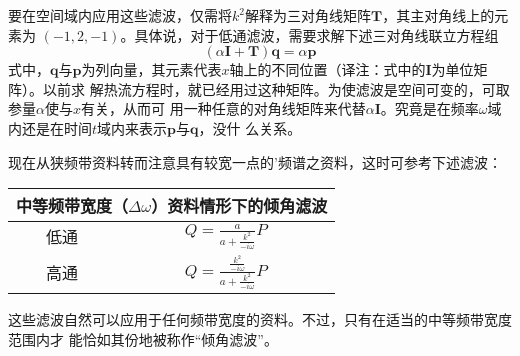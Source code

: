 要在空间域内应用这些滤波，仅需将$k^2$解释为三对角线矩阵$\mathbf{T}$，其主对角线上的元素为
$(-1,2,-1)$。具体说，对于低通滤波，需要求解下述三对角线联立方程组
\begin{equation}
(\alpha\mathbf{I}+\mathbf{T})\mathbf{q}=\alpha\mathbf{p}
\label{eq:ex2.5.1}
\end{equation}
式中，$\mathbf{q}$与$\mathbf{p}$为列向量，其元素代表$x$轴上的不同位置（译注：式中的$\mathbf{I}$为单位矩阵）。以前求
解热流方程时，就已经用过这种矩阵。为使滤波是空间可变的，可取参量$\alpha$使与$x$有关，从而可
用一种任意的对角线矩阵来代替$\alpha\mathbf{I}$。究竟是在频率$\omega$域内还是在时间$t$域内来表示$\mathbf{p}$与$\mathbf{q}$，没什
么关系。

现在从狭频带资料转而注意具有较宽一点的'频谱之资料，这时可参考下述滤波：

\begin{table}
\centering
\begin{tabular}{|c|c|}
\hline
\multicolumn{2}{|c|}{中等频带宽度（$\Delta\omega$）资料情形下的倾角滤波} \\ \hline
低通&$Q=\frac{a}{a+\frac{k^2}{-i\omega}}P$\\ \hline
高通&$Q=\frac{\frac{k^2}{-i\omega}}{a+\frac{k^2}{-i\omega}}P$ \\ \hline
\end{tabular}
\end{table}

这些滤波自然可以应用于任何频带宽度的资料。不过，只有在适当的中等频带宽度范围内才
能恰如其份地被称作“倾角滤波”。
